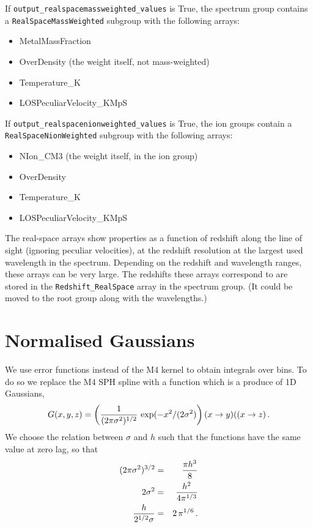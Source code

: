 \documentclass{report}
\newcommand{\param}[1]{{\tt #1}}
\begin{document}
If \param{output\_realspacemassweighted\_values} is True, the spectrum group contains a \param{RealSpaceMassWeighted} subgroup with the following arrays:
\begin{itemize}
\item MetalMassFraction 
\item OverDensity (the weight itself, not mass-weighted)
\item Temperature\_K
\item LOSPeculiarVelocity\_KMpS
\end{itemize}

If \param{output\_realspacenionweighted\_values} is True, the ion groups contain a \param{RealSpaceNionWeighted} subgroup with the following arrays:
\begin{itemize}
\item NIon\_CM3  (the weight itself, in the ion group)
\item OverDensity 
\item Temperature\_K
\item LOSPeculiarVelocity\_KMpS
\end{itemize}

The real-space arrays show properties as a function of redshift along the line of sight (ignoring peculiar velocities), at the redshift resolution at the largest used wavelength in the spectrum. Depending on the redshift and wavelength ranges, these arrays can be very large. The redshifts these arrays correspond to are stored in the \param{Redshift\_RealSpace} array in the spectrum group. (It could be moved to the root group along with the wavelengths.)


\section{Normalised Gaussians}
We use error functions instead of the M4 kernel to obtain integrals over bins. To do so we replace the M4 SPH spline with a function which is a produce of 1D Gaussians,
\begin{equation}
G(x,y,z) = \left({1\over (2\pi \sigma^2)^{1/2}}\,\exp(-x^2/(2\sigma^2)\right)(x\rightarrow y)((x\rightarrow z)\,.
\end{equation}
We choose the relation between $\sigma$ and $h$ such that the functions have the same value at zero lag, so that
\begin{eqnarray}
(2\pi\sigma^2)^{3/2} &=& {\pi h^3\over 8}\nonumber\\
2\sigma^2 &=& {h^2\over 4 \pi^{1/3}}\nonumber\\
{h\over 2^{1/2}\sigma} &=& 2\,\pi^{1/6}\,.
\end{eqnarray}
\end{document}
